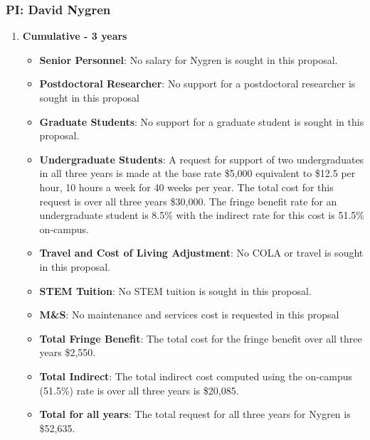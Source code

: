 \newpage

\subsubsection{\bf PI: David Nygren}
\begin{enumerate}

\item[]{\textbf{Cumulative - 3 years}}

\begin{itemize}[noitemsep,nolistsep]
\item{{\bf Senior Personnel}: No salary for Nygren is sought in this proposal.}

\item {{\bf Postdoctoral Researcher}: No support for a postdoctoral researcher is sought in this proposal } 

\item{{\bf Graduate Students}: No support for a graduate student is sought in this proposal. }

\item {{\bf Undergraduate Students}: A request for support of two undergraduates in all three years is made at the base rate \$5,000 equivalent to \$12.5 per hour, 10 hours a week for 40 weeks per year.  The total cost for this request is over all three years \$30,000.  The fringe benefit rate for an undergraduate student is 8.5\% with the indirect rate for this cost is 51.5\% on-campus.}

\item{{\bf Travel and Cost of Living Adjustment}: No COLA or travel is sought in this proposal.}

\item {{\bf STEM Tuition}: No STEM tuition is sought in this proposal.}

\item {{\bf M\&S}: No maintenance and services cost is requested in this propsal }

\item {{\bf Total Fringe Benefit}: The total cost for the fringe benefit over all three years \$2,550.}

\item {{\bf Total Indirect}: The total indirect cost computed using the on-campus (51.5\%) rate is over all three years is \$20,085.}

\item {{\bf Total for all years}: The total request for all three years for Nygren is \$52,635.}


\end{itemize}
\end{enumerate}
